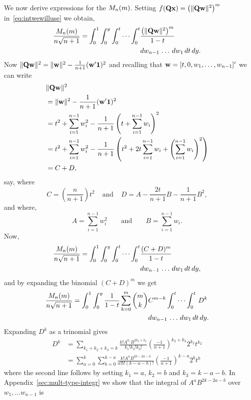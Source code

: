 \documentclass[journal]{IEEEtran}
\begin{document}
We now derive expressions for the $M_n(m)$.  Setting $f(\mathbf{Q}\mathbf{x}) = \left(\|\mathbf{Q}\mathbf{w}\|^{2}\right)^m$ in~\eqref{eq:intwewilluse} we obtain,
\begin{align*}
\frac{M_n(m)}{n\sqrt{n+1}} = \int_0^1 \int_0^y \int_0^t \cdots \int_0^t &\frac{\left(\|\mathbf{Q}\mathbf{w}\|^2\right)^m}{1 - t} \\
&dw_{n-1} \, \dots \, dw_1 \, dt \, dy.
\end{align*}
Now $\|\mathbf{Q}\mathbf{w}\|^2 = \|\mathbf{w}\|^2 - \frac{1}{n+1}(\mathbf{w}^\prime \boldsymbol{1})^2$ and recalling that $\mathbf{w} = [t,0,w_1,\dots,w_{n-1}]'$ we can write
\begin{align*}
&\|\mathbf{Q}\mathbf{w}\|^2 \\
&= \|\mathbf{w}\|^2 - \frac{1}{n+1}(\mathbf{w}^\prime \boldsymbol{1})^2 \\
&= t^2 + \sum_{i=1}^{n-1}w_i^2 - \frac{1}{n+1}\left( t + \sum_{i=1}^{n-1}w_i \right)^2 \\
&= t^2 + \sum_{i=1}^{n-1}w_i^2 - \frac{1}{n+1}\left( t^2 + 2 t \sum_{i=1}^{n-1}w_i + \left(\sum_{i=1}^{n-1}w_i \right)^2 \right)\\
&= C + D,
\end{align*}
say, where
\[
C = \left(\frac{n}{n+1} \right) t^2 \;\;\;\; \text{and} \;\;\;\; D = A - \frac{2t}{n+1}B - \frac{1}{n+1}B^2,
\]
and where,
\[
 A = \sum_{i=1}^{n-1}w_i^2 \qquad \text{and} \qquad B = \sum_{i=1}^{n-1}w_i.
\]
Now,
\begin{align*}
 \frac{M_n(m)}{n\sqrt{n+1}} =  \int_0^1 \int_0^y \int_0^t \cdots \int_0^t &\frac{(C+D)^m}{1 - t} \\
&dw_{n-1} \, \dots \, dw_1 \, dt \, dy,
\end{align*}
and by expanding the binomial $(C+D)^m$ we get
\begin{align*}
\frac{M_n(m)}{n\sqrt{n+1}} =  \int_0^1 \int_0^y \frac{1}{1 - t}\sum_{k=0}^{m}\binom{m}{k} &C^{m-k} \int_0^t \cdots \int_0^t \, D^{k} \\
&dw_{n-1} \, \dots \, dw_1 \, dt \, dy.
\end{align*}
Expanding $D^k$ as a trinomial gives
\begin{align*}
D^k &= \sum_{k_1+k_2+k_3=k} \frac{k! A^{k_1} B^{2k_3 + k_2}}{k_1! k_2! k_3!} \left(\frac{-1}{n+1}\right)^{k_2+k_3}2^{k_2}t^{k_2}  \\
&=  \sum_{a=0}^k\sum_{b=0}^{k-a} \frac{k!  A^{a} B^{2k - 2a - b}}{a! b! (k-a-b)!} \left(\frac{-1}{n+1}\right)^{k - a}2^{b}t^{b}
\end{align*}
where the second line follows by setting $k_1 = a$, $k_2 = b$ and $k_3 = k - a - b$.  In Appendix~\ref{sec:mult-type-integr} we show that the integral of $A^{a} B^{2k - 2a - b}$ over $w_1,\dots w_{n-1}$ is
\end{document}
